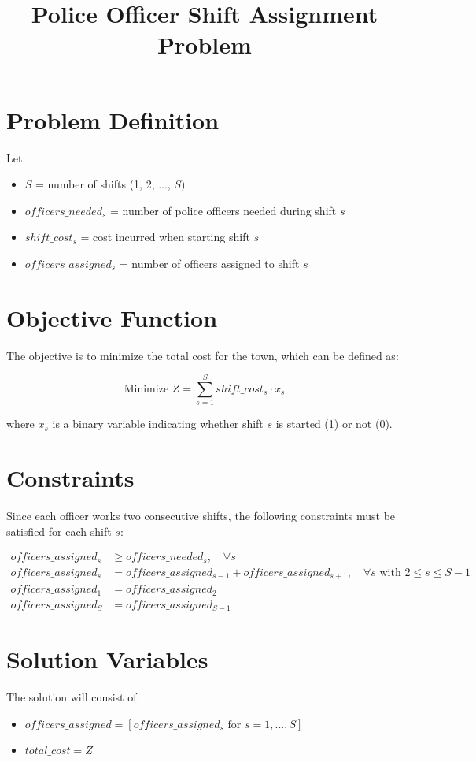 \documentclass{article}
\begin{document}
\title{Police Officer Shift Assignment Problem}
\author{}
\date{}
\maketitle

\section*{Problem Definition}

Let:
\begin{itemize}
    \item \( S \) = number of shifts (1, 2, ..., \( S \))
    \item \( officers\_needed_s \) = number of police officers needed during shift \( s \)
    \item \( shift\_cost_s \) = cost incurred when starting shift \( s \)
    \item \( officers\_assigned_s \) = number of officers assigned to shift \( s \)
\end{itemize}

\section*{Objective Function}

The objective is to minimize the total cost for the town, which can be defined as:

\[
\text{Minimize } Z = \sum_{s=1}^{S} shift\_cost_s \cdot x_s
\]

where \( x_s \) is a binary variable indicating whether shift \( s \) is started (1) or not (0). 

\section*{Constraints}

Since each officer works two consecutive shifts, the following constraints must be satisfied for each shift \( s \):

\begin{align*}
officers\_assigned_{s} & \geq officers\_needed_{s}, \quad \forall s \\
officers\_assigned_{s} & = officers\_assigned_{s-1} + officers\_assigned_{s+1}, \quad \forall s \text{ with } 2 \leq s \leq S-1 \\
officers\_assigned_1 & = officers\_assigned_2 \\
officers\_assigned_S & = officers\_assigned_{S-1}
\end{align*}

\section*{Solution Variables}

The solution will consist of:
\begin{itemize}
    \item \( officers\_assigned = [officers\_assigned_s \text{ for } s = 1, ..., S] \)
    \item \( total\_cost = Z \)
\end{itemize}
\end{document}
